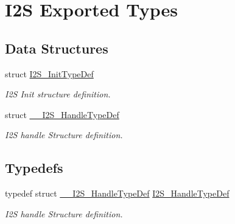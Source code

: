 \hypertarget{group___i2_s___exported___types}{}\section{I2S Exported Types}
\label{group___i2_s___exported___types}
\subsection*{Data Structures}
\begin{DoxyCompactItemize}
\item 
struct \hyperlink{struct_i2_s___init_type_def}{I2\+S\+\_\+\+Init\+Type\+Def}
\begin{DoxyCompactList}\small\item\em I2S Init structure definition. \end{DoxyCompactList}\item 
struct \hyperlink{struct_____i2_s___handle_type_def}{\+\_\+\+\_\+\+I2\+S\+\_\+\+Handle\+Type\+Def}
\begin{DoxyCompactList}\small\item\em I2S handle Structure definition. \end{DoxyCompactList}\end{DoxyCompactItemize}
\subsection*{Typedefs}
\begin{DoxyCompactItemize}
\item 
\mbox{\label{group___i2_s___exported___types_ga859f888192a094b456619601937580f5}} 
typedef struct \hyperlink{struct_____i2_s___handle_type_def}{\+\_\+\+\_\+\+I2\+S\+\_\+\+Handle\+Type\+Def} \hyperlink{group___i2_s___exported___types_ga859f888192a094b456619601937580f5}{I2\+S\+\_\+\+Handle\+Type\+Def}
\begin{DoxyCompactList}\small\item\em I2S handle Structure definition. \end{DoxyCompactList}\end{DoxyCompactItemize}
